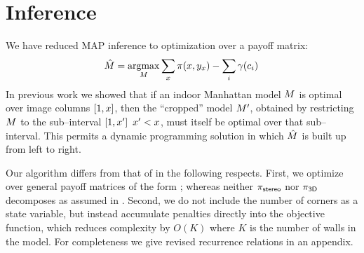 \section{Inference}
\label{sect:inference}
We have reduced MAP inference to optimization over a payoff matrix:
\begin{equation}
  \hat{M} = \operatorname*{argmax}_M\limits \sum_x \pi(x,y_x) -
  \sum_i \gamma(c_i) \,
\end{equation}
In previous work \cite{FlintECCV10} we showed that if an indoor
Manhattan model $M$ is optimal over image columns
$\left[1,x\right]$, then the ``cropped'' model
$M'$, obtained by restricting $M$ to the
sub--interval $\left[1,x'\right] ~x'<x$,
must itself be optimal over that sub--interval. This permits a dynamic
programming solution in which $\hat{M}$ is built up from left to
right.

Our algorithm differs from that of \cite{FlintECCV10} in the following
respects. First, we optimize over general payoff matrices of the form
; whereas neither $\pi_{\textsf{stereo}}$ nor $\pi_{\textsf{3D}}$
decomposes as assumed in \cite{FlintECCV10}.
Second, we do not include the number of
corners as a state variable, but instead accumulate penalties directly
into the objective function, which reduces complexity by $O(K)$ where
$K$ is the number of walls in the model. For completeness we give
revised recurrence relations in an appendix.

